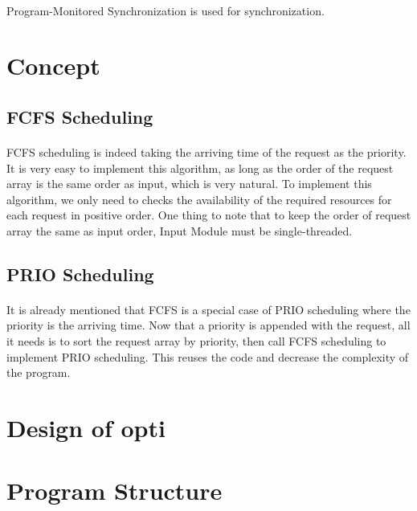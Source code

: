 \documentclass{article}
\begin{document}
            \paragraph{}
            Program-Monitored Synchronization is used for synchronization.
    \cleardoublepage
    \section{Concept}
        \subsection{FCFS Scheduling}
            \paragraph{}
                FCFS scheduling is indeed taking the arriving time of the request as the
                priority. It is very easy to implement this algorithm, as long as the
                order of the request array is the same order as input, which is very
                natural. To implement this algorithm, we only need to checks the availability of the required resources for each request in positive order. One thing to note that to keep the order of request array the
                same as input order, Input Module must be single-threaded. 
        \subsection{PRIO Scheduling}
            \paragraph{}
            It is already mentioned that FCFS is a special case of PRIO scheduling where
            the priority is the arriving time. Now that a priority is appended with the
            request, all it needs is to sort the request array by priority, then call
            FCFS scheduling to implement PRIO scheduling. This reuses the code and
            decrease the complexity of the program. 
    \cleardoublepage
    \section{Design of opti}

    \cleardoublepage
    \section{Program Structure}
\end{document}
